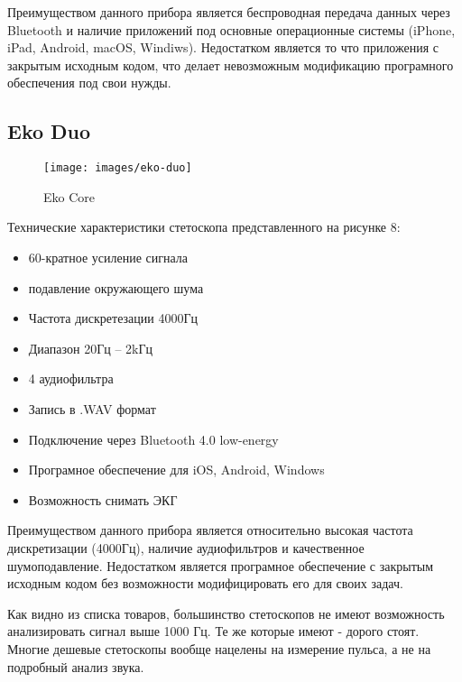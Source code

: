 \documentclass[../main.tex]{subfiles}
\begin{document}
Преимуществом данного прибора является беспроводная передача данных через Bluetooth и наличие приложений под основные операционные системы (iPhone, iPad, Android, macOS, Windiws). Недостатком является то что приложения с закрытым исходным кодом, что делает невозможным модификацию програмного обеспечения под свои нужды.

\subsection{Eko Duo}
\begin{figure}[H]
\centering
\texttt{[image: images/eko-duo]}
\caption{Eko Core}
\end{figure}

Технические характеристики \cite{eko-duo} стетоскопа представленного на рисунке 8:
\begin{itemize}
  \item 60-кратное усиление сигнала
  \item подавление окружающего шума
  \item Частота дискретезации 4000Гц
  \item Диапазон 20Гц – 2kГц
  \item 4 аудиофильтра
  \item Запись в .WAV формат
  \item Подключение через Bluetooth 4.0 low-energy
  \item Програмное обеспечение для iOS, Android, Windows
  \item Возможность снимать ЭКГ
\end{itemize}

Преимуществом данного прибора является относительно высокая частота дискретизации (4000Гц), наличие аудиофильтров и качественное шумоподавление. Недостатком является програмное обеспечение с закрытым исходным кодом без возможности модифицировать его для своих задач.

Как видно из списка товаров, большинство стетоскопов не имеют возможность анализировать сигнал выше 1000 Гц. Те же которые имеют - дорого стоят. Многие дешевые стетоскопы вообще нацелены на измерение пульса, а не на подробный анализ звука.
\newpage
\end{document}
